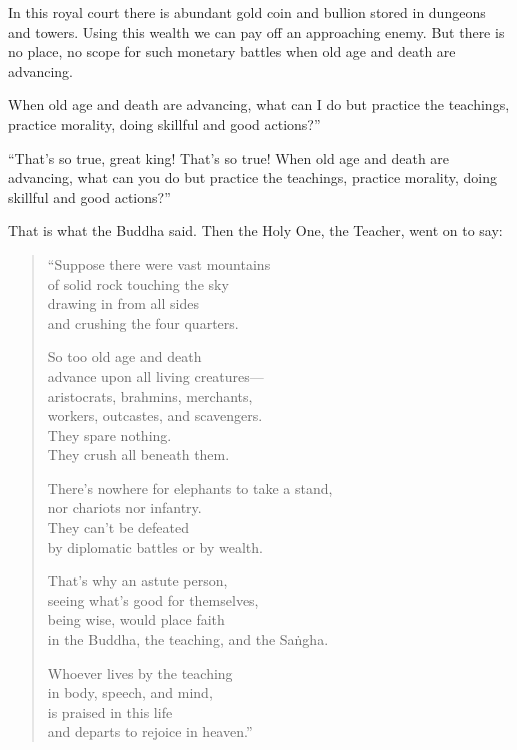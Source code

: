 \documentclass[12pt,openany]{book}%
\begin{document}
In this royal court there is abundant gold coin and bullion stored in dungeons and towers. Using this wealth we can pay off an approaching enemy. But there is no place, no scope for such monetary battles when old age and death are advancing. 

When old age and death are advancing, what can I do but practice the teachings, practice morality, doing skillful and good actions?” 

“That’s so true, great king! That’s so true! When old age and death are advancing, what can you do but practice the teachings, practice morality, doing skillful and good actions?” 

That is what the Buddha said. Then the Holy One, the Teacher, went on to say: 

\begin{verse}%
“Suppose there were vast mountains \\
of solid rock touching the sky \\
drawing in from all sides \\
and crushing the four quarters. 

So too old age and death \\
advance upon all living creatures—\\
aristocrats, brahmins, merchants, \\
workers, outcastes, and scavengers. \\
They spare nothing. \\
They crush all beneath them. 

There’s nowhere for elephants to take a stand, \\
nor chariots nor infantry. \\
They can’t be defeated \\
by diplomatic battles or by wealth. 

That’s why an astute person, \\
seeing what’s good for themselves, \\
being wise, would place faith \\
in the Buddha, the teaching, and the \textsanskrit{Saṅgha}. 

Whoever lives by the teaching \\
in body, speech, and mind, \\
is praised in this life \\
and departs to rejoice in heaven.” 

%
\end{verse}
\end{document}
